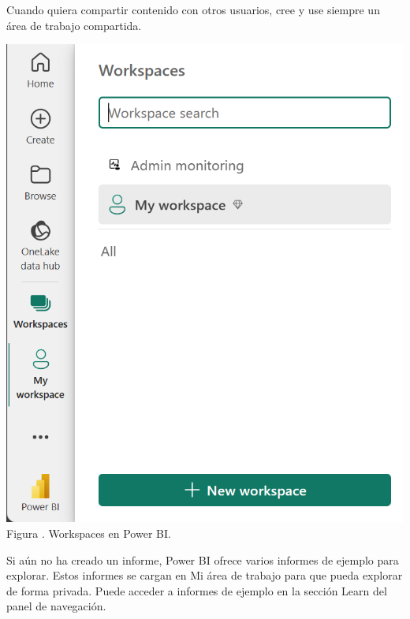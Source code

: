 \documentclass[12pt]{report}
\theoremstyle{largebreak}
\newcounter{figcount}
\begin{document}
    \begin{obs}
      Cuando quiera compartir contenido con otros usuarios, cree y use siempre un área de trabajo compartida.
    \end{obs}

    \begin{minipage}{\textwidth}
      \begin{center}
          \includegraphics[scale=0.5]{images/01.png}\\
          Figura \thefigcount. Workspaces en Power BI.
        \end{center}
    \end{minipage}

    Si aún no ha creado un informe, Power BI ofrece varios informes de ejemplo para explorar. Estos informes se cargan en Mi área de trabajo para que pueda explorar de forma privada. Puede acceder a informes de ejemplo en la sección Learn del panel de navegación.
\end{document}

